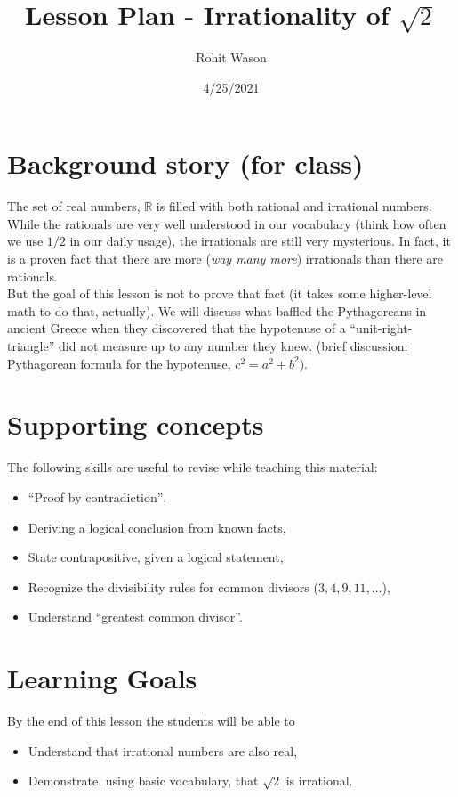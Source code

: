 \documentclass{article}
\author{Rohit Wason}
\title{Lesson Plan - Irrationality of $\sqrt{2}$}
\date{4/25/2021}
\begin{document}
\maketitle

\section*{Background story (for class)}
The set of real numbers, $\mathbb{R}$ is filled with both rational
and irrational numbers. While the rationals are very well understood in our 
vocabulary (think how often we use $1/2$ in our daily usage), the irrationals
are still very mysterious. In fact, it is a proven fact that there are more
(\textit{way many more}) irrationals than there are rationals.\\

But the goal of this lesson is not to prove that fact (it takes some
higher-level math to do that, actually). We will discuss what baffled the 
Pythagoreans in ancient Greece when they discovered that the hypotenuse of a 
``unit-right-triangle'' did not measure up to any number they knew.
(brief discussion: Pythagorean formula for the hypotenuse, $c^2=a^2+b^2$).

\section*{Supporting concepts}
The following skills are useful to revise while teaching this material:
\begin{itemize}
  \item ``Proof by contradiction'',
  \item Deriving a logical conclusion from known facts,
  \item State contrapositive, given a logical statement,
  \item Recognize the divisibility rules for common divisors ($3,4,9,11,\dots$),
  \item Understand ``greatest common divisor''.
\end{itemize}

\section*{Learning Goals}
By the end of this lesson the students will be able to
\begin{itemize}
  \item Understand that irrational numbers are also real,
  \item Demonstrate, using basic vocabulary, that $\sqrt{2}$ is irrational.
\end{itemize}
\end{document}
